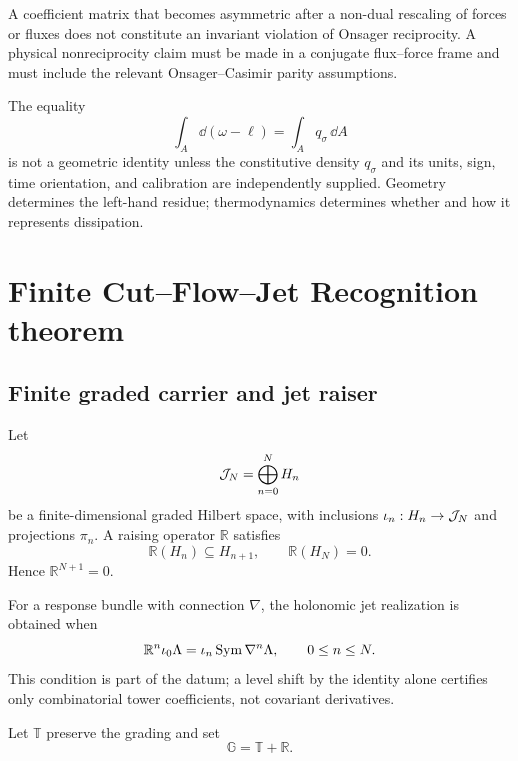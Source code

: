 \begin{corollary}
A coefficient matrix that becomes asymmetric after a non-dual rescaling of forces or fluxes does not constitute an invariant violation of Onsager reciprocity.  A physical nonreciprocity claim must be made in a conjugate flux--force frame and must include the relevant Onsager--Casimir parity assumptions.
\end{corollary}

\begin{principle}
The equality
\[
\int_A\dd(\omega-\ell)=\int_A q_\sigma\,\dd A
\]
is not a geometric identity unless the constitutive density $q_\sigma$ and its units, sign, time orientation, and calibration are independently supplied.  Geometry determines the left-hand residue; thermodynamics determines whether and how it represents dissipation.
\end{principle}

\section{Finite Cut--Flow--Jet Recognition theorem}
\label{sec:cut-flow-capstone}

\subsection{Finite graded carrier and jet raiser}

Let
\[
\mathcal J_N=\bigoplus_{n=0}^N H_n
\]
be a finite-dimensional graded Hilbert space, with inclusions $\iota_n:H_n\to\mathcal J_N$ and projections $\pi_n$.  A raising operator $\mathbb R$ satisfies
\[
\mathbb R(H_n)\subseteq H_{n+1},
\qquad
\mathbb R(H_N)=0.
\]
Hence $\mathbb R^{N+1}=0$.

For a response bundle with connection $\nabla$, the holonomic jet realization is obtained when
\begin{equation}
\mathbb R^n\iota_0\Lambda
=\iota_n\operatorname{Sym}\nabla^n\Lambda,
\qquad 0\le n\le N.
\label{eq:holonomic-raiser}
\end{equation}
This condition is part of the datum; a level shift by the identity alone certifies only combinatorial tower coefficients, not covariant derivatives.

Let $\mathbb T$ preserve the grading and set
\[
\mathbb G=\mathbb T+\mathbb R.
\]

